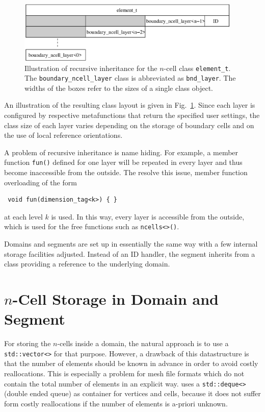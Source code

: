 \begin{figure}[tb]
\centering
 \includegraphics[width=0.95\textwidth]{figures/recursive-inheritance.eps}
 \caption{Illustration of recursive inheritance for the $n$-cell class \lstinline|element_t|. The \lstinline|boundary_ncell_layer| class is abbreviated as \lstinline|bnd_layer|. The widths of the boxes refer to the sizes of a single class object.}
 \label{fig:recursive-inheritance}
\end{figure}
An illustration of the resulting class layout is given in Fig.~\ref{fig:recursive-inheritance}.
Since each layer is configured by respective metafunctions that return the specified user settings,
the class size of each layer varies depending on the storage of boundary cells and on the use of local reference orientations.

A problem of recursive inheritance is name hiding. For example, a member function \lstinline|fun()| defined for one layer
will be repeated in every layer and thus become inaccessible from the outside. The resolve this issue, member function overloading of the form
\begin{lstlisting}
 void fun(dimension_tag<k>) { }
\end{lstlisting}
at each level $k$ is used. In this way, every layer is accessible from the outside, which is used for the free functions such as \lstinline|ncells<>()|.

Domains and segments are set up in essentially the same way with a few internal storage facilities adjusted.
Instead of an ID handler, the segment inherits from a class providing a reference to the underlying domain.

\section{$n$-Cell Storage in Domain and Segment}
For storing the $n$-cells inside a domain, the natural approach is to use a \lstinline|std::vector<>| for that purpose.
However, a drawback of this datastructure is that the number of elements should be known in advance in order to avoid
costly reallocations. This is especially a problem for mesh file formats which do not contain the total number of elements in an explicit way.
{\ViennaGrid} uses a \lstinline|std::deque<>| (double ended queue) as container for vertices and cells, because it does not suffer form costly reallocations
if the number of elements is a-priori unknown.

